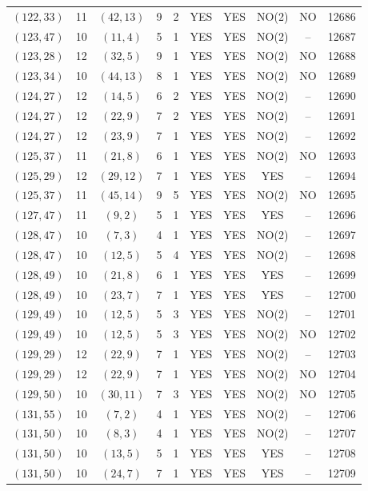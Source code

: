 \begin{longtable}{|c|c|c|c|c|c|c|c|c|c|}
$(122, 33)$ & 11 & $(42, 13)$ & 9 & 2 & YES & YES & NO(2) & NO & 12686\\
$(123, 47)$ & 10 & $(11, 4)$ & 5 & 1 & YES & YES & NO(2) & -- & 12687\\
$(123, 28)$ & 12 & $(32, 5)$ & 9 & 1 & YES & YES & NO(2) & NO & 12688\\
$(123, 34)$ & 10 & $(44, 13)$ & 8 & 1 & YES & YES & NO(2) & NO & 12689\\
$(124, 27)$ & 12 & $(14, 5)$ & 6 & 2 & YES & YES & NO(2) & -- & 12690\\
$(124, 27)$ & 12 & $(22, 9)$ & 7 & 2 & YES & YES & NO(2) & -- & 12691\\
$(124, 27)$ & 12 & $(23, 9)$ & 7 & 1 & YES & YES & NO(2) & -- & 12692\\
$(125, 37)$ & 11 & $(21, 8)$ & 6 & 1 & YES & YES & NO(2) & NO & 12693\\
$(125, 29)$ & 12 & $(29, 12)$ & 7 & 1 & YES & YES & YES & -- & 12694\\
$(125, 37)$ & 11 & $(45, 14)$ & 9 & 5 & YES & YES & NO(2) & NO & 12695\\
$(127, 47)$ & 11 & $(9, 2)$ & 5 & 1 & YES & YES & YES & -- & 12696\\
$(128, 47)$ & 10 & $(7, 3)$ & 4 & 1 & YES & YES & NO(2) & -- & 12697\\
$(128, 47)$ & 10 & $(12, 5)$ & 5 & 4 & YES & YES & NO(2) & -- & 12698\\
$(128, 49)$ & 10 & $(21, 8)$ & 6 & 1 & YES & YES & YES & -- & 12699\\
$(128, 49)$ & 10 & $(23, 7)$ & 7 & 1 & YES & YES & YES & -- & 12700\\
$(129, 49)$ & 10 & $(12, 5)$ & 5 & 3 & YES & YES & NO(2) & -- & 12701\\
$(129, 49)$ & 10 & $(12, 5)$ & 5 & 3 & YES & YES & NO(2) & NO & 12702\\
$(129, 29)$ & 12 & $(22, 9)$ & 7 & 1 & YES & YES & NO(2) & -- & 12703\\
$(129, 29)$ & 12 & $(22, 9)$ & 7 & 1 & YES & YES & NO(2) & NO & 12704\\
$(129, 50)$ & 10 & $(30, 11)$ & 7 & 3 & YES & YES & NO(2) & NO & 12705\\
$(131, 55)$ & 10 & $(7, 2)$ & 4 & 1 & YES & YES & NO(2) & -- & 12706\\
$(131, 50)$ & 10 & $(8, 3)$ & 4 & 1 & YES & YES & NO(2) & -- & 12707\\
$(131, 50)$ & 10 & $(13, 5)$ & 5 & 1 & YES & YES & YES & -- & 12708\\
$(131, 50)$ & 10 & $(24, 7)$ & 7 & 1 & YES & YES & YES & -- & 12709\\

\end{longtable}
